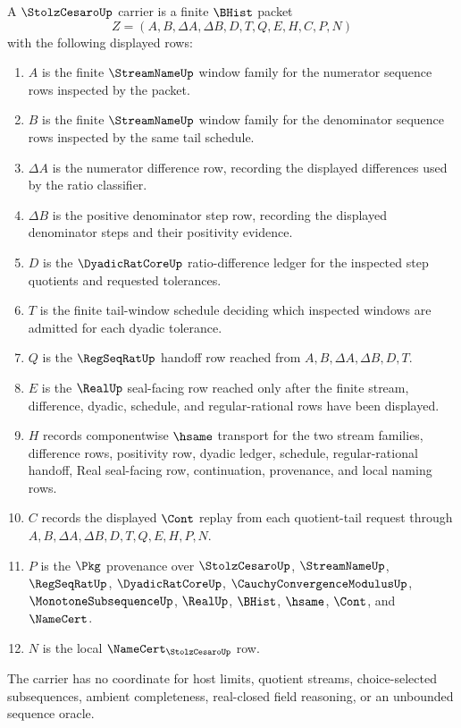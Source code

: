 \begin{definition}
\label{def:stolz-cesaro-carrier}
A $\StolzCesaroUp$ carrier is a finite $\BHist$ packet
$$
Z=(A,B,\Delta A,\Delta B,D,T,Q,E,H,C,P,N)
$$
with the following displayed rows:
\begin{enumerate}
\item $A$ is the finite $\StreamNameUp$ window family for the numerator sequence rows inspected by the packet.
\item $B$ is the finite $\StreamNameUp$ window family for the denominator sequence rows inspected by the same tail schedule.
\item $\Delta A$ is the numerator difference row, recording the displayed differences used by the ratio classifier.
\item $\Delta B$ is the positive denominator step row, recording the displayed denominator steps and their positivity evidence.
\item $D$ is the $\DyadicRatCoreUp$ ratio-difference ledger for the inspected step quotients and requested tolerances.
\item $T$ is the finite tail-window schedule deciding which inspected windows are admitted for each dyadic tolerance.
\item $Q$ is the $\RegSeqRatUp$ handoff row reached from $A,B,\Delta A,\Delta B,D,T$.
\item $E$ is the $\RealUp$ seal-facing row reached only after the finite stream, difference, dyadic, schedule, and regular-rational rows have been displayed.
\item $H$ records componentwise $\hsame$ transport for the two stream families, difference rows, positivity row, dyadic ledger, schedule, regular-rational handoff, Real seal-facing row, continuation, provenance, and local naming rows.
\item $C$ records the displayed $\Cont$ replay from each quotient-tail request through $A,B,\Delta A,\Delta B,D,T,Q,E,H,P,N$.
\item $P$ is the $\Pkg$ provenance over $\StolzCesaroUp$, $\StreamNameUp$, $\RegSeqRatUp$, $\DyadicRatCoreUp$, $\CauchyConvergenceModulusUp$, $\MonotoneSubsequenceUp$, $\RealUp$, $\BHist$, $\hsame$, $\Cont$, and $\NameCert$.
\item $N$ is the local $\NameCert_{\StolzCesaroUp}$ row.
\end{enumerate}
The carrier has no coordinate for host limits, quotient streams, choice-selected subsequences, ambient completeness, real-closed field reasoning, or an unbounded sequence oracle.
\end{definition}

